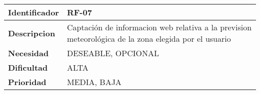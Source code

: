 \begin{center}
    \begin{tabular}{|p{2.6cm}|p{12cm}|}
    \hline
    \textbf{Identificador} & RF-07\\
    \hline
    \textbf{Descripcion} & Captación de informacion web relativa a la prevision meteorológica de la zona elegida por el usuario\\
    \hline
    \textbf{Necesidad} & DESEABLE, OPCIONAL\\
    \hline
    \textbf{Dificultad} & ALTA\\
    \hline
    \textbf{Prioridad} & MEDIA, BAJA\\
    \hline
    \end{tabular}
\end{center}
